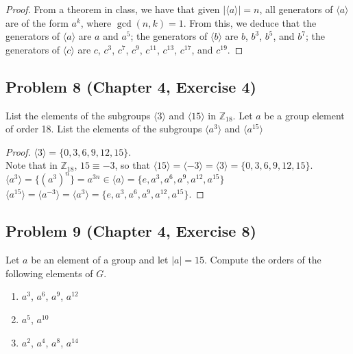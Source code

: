 \documentclass{article}
\begin{document}
\begin{proof}

From a theorem in class, we have that given $|\langle a \rangle| = n$, all generators of $\langle a \rangle$ are of the form $a^k$, where $\gcd{(n, k)} = 1$. From this, we deduce that the generators of $\langle a \rangle$ are $a$ and $a^5$; the generators of $\langle b \rangle$ are $b$, $b^3$, $b^5$, and $b^7$; the generators of $\langle c \rangle$ are $c$, $c^3$, $c^7$, $c^9$, $c^{11}$, $c^{13}$, $c^{17}$, and $c^{19}$.

\end{proof}

\subsection*{Problem 8 (Chapter 4, Exercise 4)}
List the elements of the subgroups $\langle 3 \rangle$ and $\langle 15 \rangle$ in $\mathbb{Z}_{18}$. Let $a$ be a group element of order 18. List the elements of the subgroups $\langle a^3 \rangle$ and $\langle a^{15} \rangle$

\begin{proof}

$\langle 3 \rangle = \{0, 3, 6, 9, 12, 15\}$. \\
Note that in $\mathbb{Z}_{18}$, $15 \equiv -3$, so that $\langle 15 \rangle = \langle -3 \rangle = \langle 3 \rangle = \{0, 3, 6, 9, 12, 15\}$. \\
$\langle a^3 \rangle = \{(a^3)^n\} = a^{3n} \in \langle a \rangle = \{e, a^3, a^6, a^9, a^{12}, a^{15}\}$ \\
$\langle a^{15} \rangle = \langle a^{-3} \rangle = \langle a^{3} \rangle = \{e, a^3, a^6, a^9, a^{12}, a^{15}\}$.

\end{proof}

\subsection*{Problem 9 (Chapter 4, Exercise 8)}
Let $a$ be an element of a group and let $|a| = 15$. Compute the orders of the following elements of $G$.
\begin{enumerate}[label=(\alph*)]
\item $a^3$, $a^6$, $a^9$, $a^{12}$
\item $a^5$, $a^{10}$
\item $a^2$, $a^4$, $a^8$, $a^{14}$
\end{enumerate}
\end{document}
